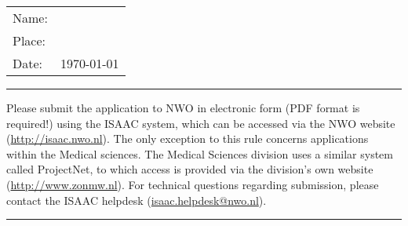 \vspace{2em}

\begin{tabular}{ll}
Name: &\\
Place: &\\
Date: &\today\\
\end{tabular}

\vspace{2em}

\noindent\rule{\textwidth}{0.4pt}

\noindent Please submit the application to NWO in electronic form (PDF format is
required!) using the ISAAC system, which can be accessed via the NWO website
(\href{http://isaac.nwo.nl}{http://isaac.nwo.nl}).
The only exception to this rule concerns applications within the Medical
sciences. The Medical Sciences division uses a similar system called ProjectNet,
to which access is provided via the division's own website
(\href{http://www.zonmw.nl}{http://www.zonmw.nl}).
For technical questions regarding submission, please contact the ISAAC
helpdesk (\href{mailto:isaac.helpdesk@nwo.nl}{isaac.helpdesk@nwo.nl}).

\noindent\rule{\textwidth}{0.4pt}


